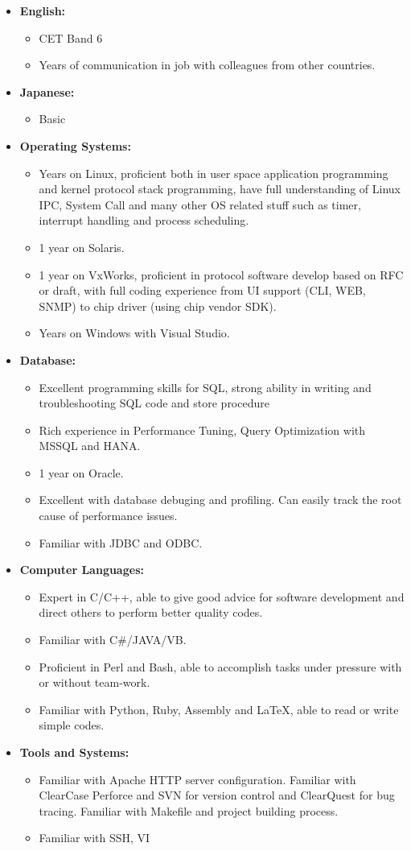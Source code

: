 \documentclass[11pt,oneside]{article}
\newenvironment{ressection}[1]{
    \vspace{4pt}
    \begin{itemize}
    \vspace{3pt}
}{
    \end{itemize}
}
\newcommand{\resitem}[1]{
    \vspace{-4pt}
    \item \begin{flushleft} #1 \end{flushleft}
}
\newcommand{\ressubitem}[1]{
    \vspace{-1pt}
    \item \begin{flushleft} #1 \end{flushleft}
}
\newenvironment{reslist}[1]{
    \resitem{\textbf{#1}}
    \vspace{-5pt}
    \begin{itemize}
}{
    \end{itemize}
}
\begin{document}
\begin{ressection}{Skills}

    \begin{reslist}{English:}
        \ressubitem{CET Band 6}
		\ressubitem{Years of communication in job with colleagues from other countries.}
    \end{reslist}
	
	\begin{reslist}{Japanese:}
		\ressubitem{Basic}
	\end{reslist}

    \begin{reslist}{Operating Systems:}
        \ressubitem{Years on Linux, proficient both in user space application programming and kernel protocol stack programming, have full understanding of Linux IPC, System Call and many other OS related stuff such as timer, interrupt handling and process scheduling.}
		\ressubitem{1 year on Solaris.}
        \ressubitem{1 year on VxWorks, proficient in protocol software develop based on RFC or draft, with full coding experience from UI support (CLI, WEB, SNMP) to chip driver (using chip vendor SDK).}
        \ressubitem{Years on Windows with Visual Studio.}
    \end{reslist}

    \begin{reslist}{Database:}
		\ressubitem{Excellent programming skills for SQL, strong ability in writing and troubleshooting SQL code and store procedure}
        \ressubitem{Rich experience in Performance Tuning, Query Optimization with MSSQL and HANA.}
		\ressubitem{1 year on Oracle.}
		\ressubitem{Excellent with database debuging and profiling. Can easily track the root cause of performance issues.}
		\ressubitem{Familiar with JDBC and ODBC.}
    \end{reslist}

    \begin{reslist}{Computer Languages:}
        \ressubitem{Expert in C/C++, able to give good advice for software development and direct others to perform better quality codes.}
		\ressubitem{Familiar with C\#/JAVA/VB.}
        \ressubitem{Proficient in Perl and Bash, able to accomplish tasks under pressure with or without team-work.}
        \ressubitem{Familiar with Python, Ruby, Assembly and \LaTeX, able to read or write simple codes.}
    \end{reslist}

    \begin{reslist}{Tools and Systems:}
        \ressubitem{Familiar with Apache HTTP server configuration. Familiar with ClearCase Perforce and SVN for version control and ClearQuest for bug tracing. Familiar with Makefile and project building process.}
        \ressubitem{Familiar with SSH, VI}
    \end{reslist}

\end{ressection}
\end{document}
